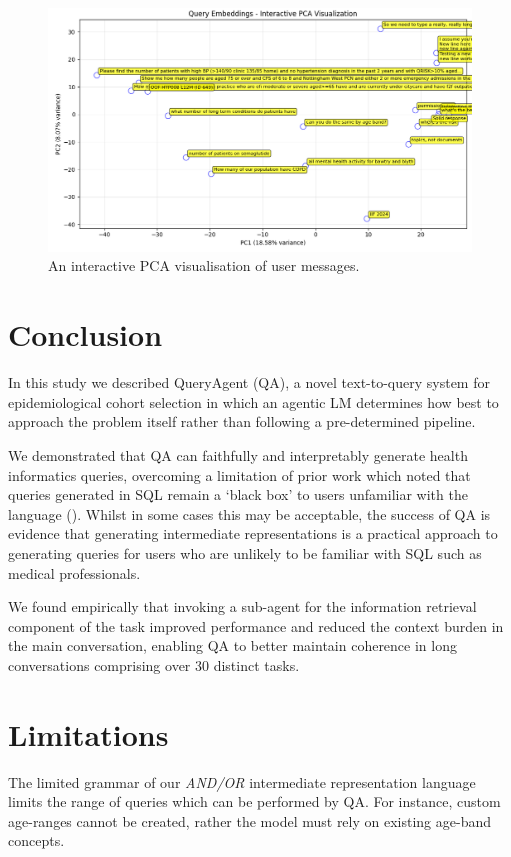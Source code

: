 \documentclass[11pt]{article}
\begin{document}
\begin{figure}[b]
  \includegraphics[width=\linewidth]{content/pca_09_16_randomly_sampled_20.png}
  \caption{
    An interactive PCA visualisation of user messages.
  }
  \label{fig:sample-user-utterances}
\end{figure}

\section{Conclusion}
In this study we described QueryAgent (QA), a novel text-to-query system for epidemiological cohort selection in which an agentic LM determines how best to approach the problem itself rather than following a pre-determined pipeline.

We demonstrated that QA can faithfully and interpretably generate health informatics queries, overcoming a limitation of prior work which noted that queries generated in SQL remain a `black box' to users unfamiliar with the language  (\citet{ziletti_generating_2025}).
Whilst in some cases this may be acceptable, the success of QA is evidence that generating intermediate representations %
is a practical approach to generating queries for users who are unlikely to be familiar with SQL such as medical professionals.

We found empirically that invoking a sub-agent for the information retrieval component of the task improved performance and reduced the context burden in the main conversation, enabling QA to better maintain coherence in long conversations comprising over 30 distinct tasks.


\section{Limitations}
The limited grammar of our \textit{AND/OR} intermediate representation language limits the range of queries which can be performed by QA.
For instance, custom age-ranges cannot be created, rather the model must rely on existing age-band concepts.
\end{document}
